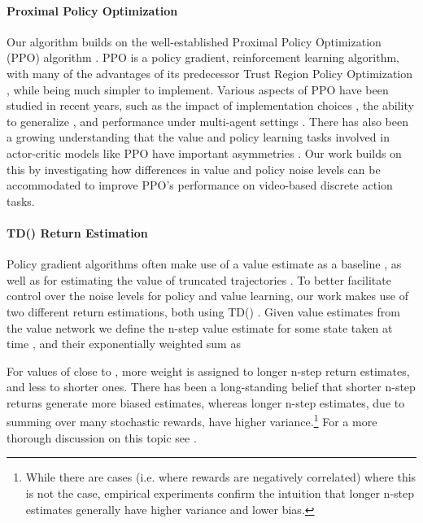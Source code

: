 \documentclass{article}
\begin{document}
\paragraph{Proximal Policy Optimization} Our algorithm builds on the well-established Proximal Policy Optimization (PPO) algorithm \cite{schulman2017proximal}. PPO is a policy gradient, reinforcement learning algorithm, with many of the advantages of its predecessor Trust Region Policy Optimization \cite{schulman2015trust}, while being much simpler to implement. Various aspects of PPO have been studied in recent years, such as the impact of implementation choices \cite{engstrom2019implementation, shengyi2022the37implementation}, the ability to generalize \cite{cobbe2021phasic, raileanu2021decoupling}, and performance under multi-agent settings \cite{yu2021surprising}. There has also been a growing understanding that the value and policy learning tasks involved in actor-critic models like PPO have important asymmetries \cite{raileanu2021decoupling, cobbe2021phasic}. Our work builds on this by investigating how differences in value and policy noise levels can be accommodated to improve PPO's performance on video-based discrete action tasks.




\paragraph{TD() Return Estimation}



Policy gradient algorithms often make use of a value estimate as a baseline \cite{mnih2016asynchronous}, as well as for estimating the value of truncated trajectories \cite{cichosz1994truncating}. To better facilitate control over the noise levels for policy and value learning, our work makes use of two different return estimations, both using TD() \cite{sutton1988learning}. Given value estimates  from the value network we define the n-step value estimate for some state  taken at time , and their exponentially weighted sum as



For values of  close to , more weight is assigned to longer n-step return estimates, and less to shorter ones. There has been a long-standing belief that shorter n-step returns generate more biased estimates, whereas longer n-step estimates, due to summing over many stochastic rewards, have higher variance.\footnote{While there are cases (i.e. where rewards are negatively correlated) where this is not the case, empirical experiments confirm the intuition that longer n-step estimates generally have higher variance and lower bias.} For a more thorough discussion on this topic see \cite{kearns2000bias}.
\end{document}
